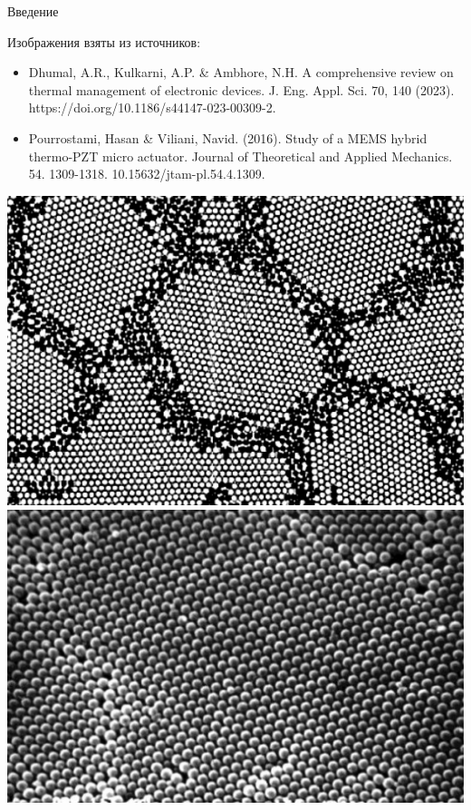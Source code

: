 \begin{frame}{Введение}
	\bigskip	
	
	Изображения взяты из источников:
	\begin{itemize}
		\justifying
		\item Dhumal, A.R., Kulkarni, A.P. \& Ambhore, N.H. A comprehensive review on thermal management of electronic devices. J. Eng. Appl. Sci. 70, 140 (2023). https://doi.org/10.1186/s44147-023-00309-2.
		\item Pourrostami, Hasan \& Viliani, Navid. (2016). Study of a MEMS hybrid thermo-PZT micro actuator. Journal of Theoretical and Applied Mechanics. 54. 1309-1318. 10.15632/jtam-pl.54.4.1309. 
	\end{itemize}
\end{frame}

\begin{frame}
	\begin{minipage}{0.29\textwidth}
		\includegraphics[width=\linewidth]{pics/Atoms.png} \\
		\medskip
		\includegraphics[width=\linewidth]{pics/Kremnezem.png} \\

\end{minipage}
\end{frame}
